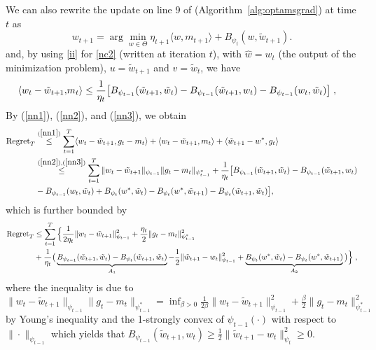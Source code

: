 \documentclass[11pt]{article}
\makeatletter
\renewenvironment{proof}[1][\proofname]{%
   \par\pushQED{\qed}\normalfont%
   \topsep6\p@\@plus6\p@\relax
   \trivlist\item[\hskip\labelsep\bfseries#1]%
   \ignorespaces
}{%
   \popQED\endtrivlist\@endpefalse
}
\theoremstyle{k}
\makeatother
\begin{document}
\begin{proof}
We can also rewrite the update on line 9 of (Algorithm~\ref{alg:optamsgrad}) at time $t$ as
\begin{equation} \label{nc2}
\textstyle w_{t+1} = \arg\min_{w \in \Theta} \eta_{t+1} \langle w, m_{t+1} \rangle + B_{\psi_t}(w, \tilde{w}_{t+1} ).
\end{equation}
and, by using \eqref{ii} for \eqref{nc2} (written at iteration $t$), with $\hat{w} = w_{t}$ (the output of the minimization problem), $u = \tilde{w}_{t+1}$ and $v = \tilde{w}_{t}$, we have
\begin{equation} \label{nn3}
\begin{aligned}
\langle w_t -\tilde{w}_{t+1}, & m_t  \rangle \leq \frac{1}{\eta_t}\big[ B_{\psi_{t-1}}(\tilde{w}_{t+1}, \tilde{w}_{t}) - B_{\psi_{t-1}}(\tilde{w}_{t+1}, w_t ) - B_{\psi_{t-1}}(w_{t}, \tilde{w}_{t}) \big] \;,
\end{aligned}
\end{equation}
By (\ref{nn1}), (\ref{nn2}), and (\ref{nn3}), we obtain
\begin{equation} \label{nnn}
\begin{aligned}
 \text{Regret}_T & \overset{(\ref{nn1})}{\leq} \sum_{t=1}^T \langle  w_t - \tilde{w}_{t+1} , g_t - m_t \rangle + \langle w_t - \tilde{w}_{t+1}, m_t \rangle + \langle \tilde{w}_{t+1} - w^*, g_t  \rangle \\
& \overset{(\ref{nn2}), (\ref{nn3})}{\leq}  \sum_{t=1}^T \| w_t - \tilde{w}_{t+1} \|_{\psi_{t-1}} \| g_t - m_t  \|_{\psi_{t-1}^*}
+ \frac{1}{\eta_t} \big[ B_{\psi_{t-1}}(\tilde{w}_{t+1}, \tilde{w}_{t}) - B_{\psi_{t-1}}(\tilde{w}_{t+1}, w_t )  \\
& - B_{\psi_{t-1}}(w_{t}, \tilde{w}_{t}) +  B_{\psi_t}( w^*, \tilde{w}_{t}) -B_{\psi_t}(w^*,  \tilde{w}_{t+1} ) - B_{\psi_t}(\tilde{w}_{t+1}, \tilde{w}_{t}) \big],
\end{aligned}
\end{equation}
which is further bounded by
\begin{equation} \label{nnnn}
\begin{aligned}
 \text{Regret}_T & \leq \sum_{t=1}^T \Big\{ \frac{1}{2 \eta_t} \| w_t - \tilde{w}_{t+1} \|_{\psi_{t-1}}^2 + \frac{\eta_t}{2} \| g_t - m_t  \|_{\psi_{t-1}^*}^2\\
 &  + \frac{1}{\eta_t} \big(\underbrace{B_{\psi_{t-1}}(\tilde{w}_{t+1}, \tilde{w}_{t}) - B_{\psi_t}(\tilde{w}_{t+1}, \tilde{w}_{t}) }_{A_1}- \frac{1}{2} \| \tilde{w}_{t+1} - w_t \|_{\psi_{t-1}}^2+\underbrace{B_{\psi_t}( w^*, \tilde{w}_{t}) -B_{\psi_t}(w^*,  \tilde{w}_{t+1} )}_{A_2}  \big) \Big\} \;,
\end{aligned}
\end{equation}
where the inequality is due to $ \| w_t - \tilde{w}_{t+1}   \|_{\psi_{t-1}} \| g_t - m_t  \|_{\psi_{t-1}^*} = \inf_{ \beta > 0 }   \frac{1}{2\beta} \| w_t - \tilde{w}_{t+1} \|_{\psi_{t-1}}^2 +  \frac{\beta}{2} \| g_t - m_t  \|_{\psi_{t-1}^*}^2$ by Young's inequality and the 1-strongly convex of $\psi_{t-1}(\cdot)$ with respect to $\| \cdot \|_{\psi_{t-1}}$ which yields that $B_{\psi_{t-1}}(\tilde{w}_{t+1}, w_t )  \geq \frac{1}{2} \| \tilde{w}_{t+1} -  w_t  \|^2_{\psi_t} \geq 0$. 


\end{proof}
\end{document}

